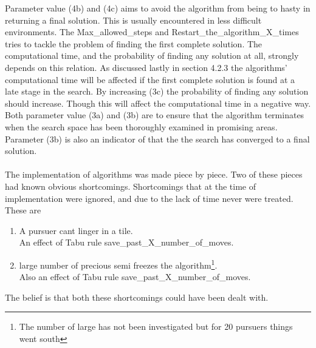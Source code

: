 Parameter value (4b) and (4c) aims to avoid the algorithm from being to hasty in returning a final solution. This is usually encountered in less difficult environments. The Max\_allowed\_steps and Restart\_the\_algorithm\_X\_times tries to tackle the problem of finding the first complete solution. The computational time, and the probability of finding any solution at all, strongly depends on this relation. As discussed lastly in section 4.2.3 the algorithms' computational time will be affected if the first complete solution is found at a late stage in the search. By increasing (3c) the probability of finding any solution should increase. Though this will affect the computational time in a negative way. Both parameter value (3a) and (3b) are to ensure that the algorithm terminates when the search space has been thoroughly examined in promising areas.
Parameter (3b) is also an indicator of that the the search has converged to a final solution.\\
\\
The implementation of algorithms was made piece by piece. Two of these pieces had known obvious shortcomings. Shortcomings that at the time of implementation were ignored, and due to the lack of time never were treated. These are\\
\begin{enumerate}
\item{} A pursuer cant linger in a tile. \vspace{0,1cm}\\
 An effect of Tabu rule save\_past\_X\_number\_of\_moves.
\item{} large number of precious semi freezes the algorithm\footnote{ The number of large has not been investigated but for 20 pursuers things went south }. \vspace{0,1cm}\\
Also an effect of Tabu rule save\_past\_X\_number\_of\_moves.
\end{enumerate} 
The belief is that both these shortcomings could have been dealt with.

